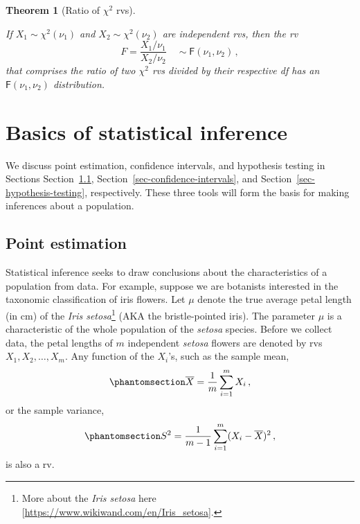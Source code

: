 \documentclass[
  a4paper,
  DIV=11,
  numbers=noendperiod,
  oneside]{scrreprt}
\theoremstyle{plain}
\newtheorem{theorem}{Theorem}[chapter]
\theoremstyle{definition}
\theoremstyle{definition}
\theoremstyle{definition}
\theoremstyle{plain}
\theoremstyle{remark}
\begin{document}
\begin{theorem}[Ratio of \(\chi^2\)
rvs]\protect\hypertarget{thm-F-dist-chisq}{}\label{thm-F-dist-chisq}

If \(X_1 \sim \chi^2(\nu_1)\) and \(X_2 \sim \chi^2(\nu_2)\) are
independent rvs, then the rv \[
 F = \frac{X_1 / \nu_1}{X_2 / \nu_2} \quad \sim \mathsf{F}(\nu_1,\nu_2)\,,
\] that comprises the ratio of two \(\chi^2\) rvs divided by their
respective df has an \(\mathsf{F}(\nu_1, \nu_2)\) distribution.

\end{theorem}

\chapter{Basics of statistical
inference}\label{sec-statistical-inference}

We discuss point estimation, confidence intervals, and hypothesis
testing in Sections Section~\ref{sec-point-estimation},
Section~\ref{sec-confidence-intervals}, and
Section~\ref{sec-hypothesis-testing}, respectively. These three tools
will form the basis for making inferences about a population.

\section{Point estimation}\label{sec-point-estimation}

Statistical inference seeks to draw conclusions about the
characteristics of a population from data. For example, suppose we are
botanists interested in the taxonomic classification of iris flowers.
Let \(\mu\) denote the true average petal length (in cm) of the
\emph{Iris setosa}\footnote{More about the \emph{Iris setosa} here
  {[}\url{https://www.wikiwand.com/en/Iris_setosa}{]}.} (AKA the
bristle-pointed iris). The parameter \(\mu\) is a characteristic of the
whole population of the \emph{setosa} species. Before we collect data,
the petal lengths of \(m\) independent \emph{setosa} flowers are denoted
by rvs \(X_1, X_2, \dots, X_m.\) Any function of the \(X_i\)'s, such as
the sample mean, \begin{equation}\phantomsection\label{eq-sample-mean}{
  \overline{X} = \frac{1}{m} \sum_{i=1}^m X_i\,, 
}\end{equation} or the sample variance,
\begin{equation}\phantomsection\label{eq-sample-var}{
  S^2 = \frac{1}{m-1} \sum_{i=1}^m (X_i - \overline{X})^2 \,, 
}\end{equation} is also a rv.
\end{document}
